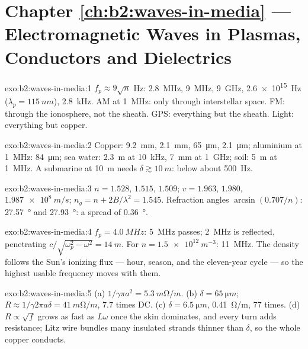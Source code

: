 \section*{Chapter \ref{ch:b2:waves-in-media} --- Electromagnetic Waves in Plasmas, Conductors and Dielectrics}

\begin{solution}{exo:b2:waves-in-media:1}
$f_p \approx 9\sqrt n$ Hz: \qty{2.8}{MHz}, \qty{9}{MHz}, \qty{9}{GHz}, \qty{2.6e15}{Hz}
($\lambda_p = \qty{115}{nm}$), \qty{2.8}{kHz}. AM at \qty{1}{MHz}: only through
interstellar space. FM: through the ionosphere, not the sheath. GPS:
everything but the sheath. Light: everything but copper.
\end{solution}

\begin{solution}{exo:b2:waves-in-media:2}
Copper: \qty{9.2}{mm}, \qty{2.1}{mm}, \qty{65}{\micro m}, \qty{2.1}{\micro m}; aluminium at
\qty{1}{MHz}: \qty{84}{\micro m}; sea water: \qty{2.3}{m} at \qty{10}{kHz}, \qty{7}{mm} at
\qty{1}{GHz}; soil: \qty{5}{m} at \qty{1}{MHz}. A submarine at \qty{10}{m} needs $\delta
\gtrsim \qty{10}{m}$: below about \qty{500}{Hz}.
\end{solution}

\begin{solution}{exo:b2:waves-in-media:3}
$n = 1.528$, $1.515$, $1.509$; $v = 1.963$, $1.980$, $\qty{1.987e8}{m/s}$; $n_g = n +
2B/\lambda^2 = 1.545$. Refraction angles $\arcsin(0.707/n)$: \qty{27.57}{\degree} and
\qty{27.93}{\degree}: a spread of \qty{0.36}{\degree}.
\end{solution}

\begin{solution}{exo:b2:waves-in-media:4}
$f_p = \qty{4.0}{MHz}$: \qty{5}{MHz} passes; \qty{2}{MHz} is reflected, penetrating
$c/\sqrt{\omega_p^2 - \omega^2} = \qty{14}{m}$. For $n = \qty{1.5e12}{m^{-3}}$: \qty{11}{MHz}. The
density follows the Sun's ionizing flux --- hour, season, and the
eleven-year cycle --- so the highest usable frequency moves with them.
\end{solution}

\begin{solution}{exo:b2:waves-in-media:5}
(a) $1/\gamma\pi a^2 = \qty{5.3}{m\ohm/m}$. (b) $\delta = \qty{65}{\micro m}$; $R \approx 1/\gamma2\pi a\delta
= \qty{41}{m\ohm/m}$, $7.7$ times DC. (c) $\delta = \qty{6.5}{\micro m}$, \qty{0.41}{\ohm/m},
$77$ times. (d) $R \propto \sqrt f$ grows as fast as $L\omega$ once the skin
dominates, and every turn adds resistance; Litz wire bundles many
insulated strands thinner than $\delta$, so the whole copper conducts.
\end{solution}

